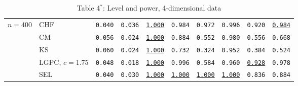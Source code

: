 \begin{table}[hp]
{\begin{tabular}{ll|rr|rrrrrr}
$n = 400$ & CHF&\texttt{0.040}&\texttt{0.036}&\texttt{\underline{1.000}}&\texttt{0.984}&\texttt{0.972}&\texttt{0.996}&\texttt{0.920}&\texttt{\underline{0.984}}\\
&CM&\texttt{0.056}&\texttt{0.024}&\texttt{\underline{1.000}}&\texttt{0.884}&\texttt{0.552}&\texttt{0.980}&\texttt{0.556}&\texttt{0.668}\\
&KS&\texttt{0.060}&\texttt{0.024}&\texttt{\underline{1.000}}&\texttt{0.732}&\texttt{0.324}&\texttt{0.952}&\texttt{0.384}&\texttt{0.524}\\
\rowcolor{Gray}&LGPC, $\scriptstyle c = 1.75$&\texttt{0.048}&\texttt{0.018}&\texttt{\underline{1.000}}&\texttt{0.996}&\texttt{0.584}&\texttt{0.960}&\texttt{\underline{0.928}}&\texttt{0.978}\\
&SEL&\texttt{0.040}&\texttt{0.030}&\texttt{\underline{1.000}}&\texttt{\underline{1.000}}&\texttt{\underline{1.000}}&\texttt{\underline{1.000}}&\texttt{0.836}&\texttt{0.884}\\
\bottomrule
\end{tabular}}
\caption*{Table 4$^*$: Level and power, 4-dimensional data}
\label{tab:dim4}
\end{table}